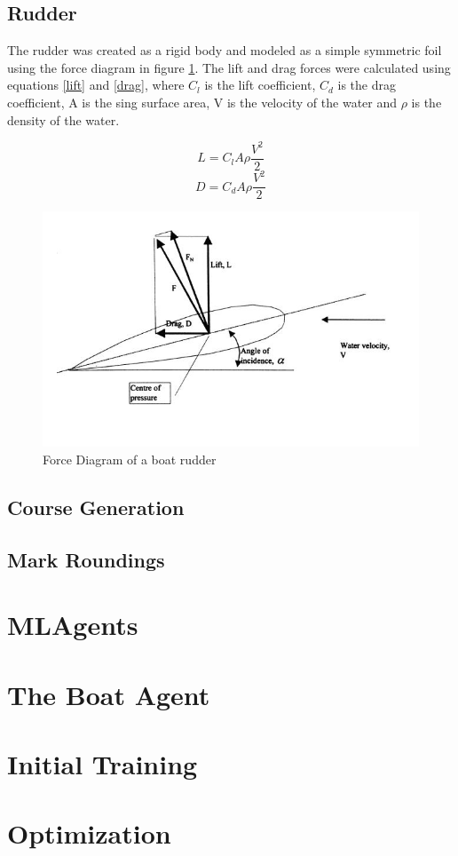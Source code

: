\subsection{Rudder}
The rudder was created as a rigid body and modeled as a simple symmetric foil using the force diagram in figure \ref{rudderForce}. The lift and drag forces were calculated using equations \ref{lift} and \ref{drag}, where ${C_l}$ is the lift coefficient, ${C_d}$ is the drag coefficient, A is the sing surface area, V is the velocity of the water and ${\rho}$ is the density of the water.



\begin{equation}
    L = {C_l}A\rho\frac{V^2}{2}
    \label{lift}
\end{equation}
\begin{equation}
    D = {C_d}A\rho\frac{V^2}{2}
    \label{drag}
\end{equation}
 
\begin{figure}
    \centering
    \includegraphics{chapters/chapter04/rudder.JPG}
    \caption{Force Diagram of a boat rudder}
    \label{rudderForce}
\end{figure}

\subsection{Course Generation}

\subsection{Mark Roundings}

\section{MLAgents}

\section{The Boat Agent}

\section{Initial Training}

\section{Optimization}

\label{sec:sec01}





